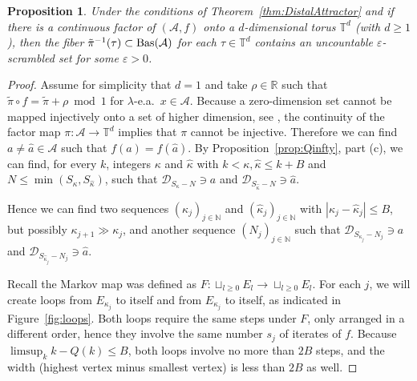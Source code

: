 \documentclass[12pt, psamsfonts, reqno]{amsart}
\newtheorem{proposition}[theorem]{Proposition}
\begin{document}
\begin{proposition}\label{prop:scrambled_fibers}
Under the conditions of Theorem~\ref{thm:DistalAttractor}
and if there is a continuous factor of
$({{\mathcal A}}, f)$ onto a $d$-dimensional torus ${{\mathbb T}}^d$
(with $d \geq 1$),
then the fiber $\tilde \pi^{-1}(\tau) \subset {\mathop{\rm Bas}\nolimits}({{\mathcal A}})$ for each
$\tau \in {{\mathbb T}}^d$ contains an uncountable
${\varepsilon}$-scrambled set for some ${\varepsilon} > 0$.
\end{proposition}

\begin{proof}
Assume for simplicity that $d=1$ and take $\rho \in {{\mathbb R}}$ such that
$\tilde \pi \circ f = \tilde \pi + \rho \bmod 1$ for $\lambda$-e.a.\ $x \in {{\mathcal A}}$.
Because a zero-dimension set cannot be mapped injectively onto a set
of higher dimension, see \cite{Engel},
the continuity of the factor map $\pi:{{\mathcal A}} \to {{\mathbb T}}^d$ implies
that $\pi$ cannot be injective.
Therefore we can find $a \neq \hat a \in {{\mathcal A}}$
such that $f(a) = f(\hat a)$.
By Proposition~\ref{prop:Qinfty}, part (c),
we can find, for every $k$,
integers $\kappa$ and $\hat \kappa$ with $k < \kappa, \hat \kappa \leq k+B$
and $N \leq \min(S_\kappa, S_{\hat \kappa})$,
such that ${{\mathcal D}}_{S_{\kappa} - N} \owns a$ and
${{\mathcal D}}_{S_{\hat \kappa} - N} \owns \hat a$.

Hence we can find two sequences $(\kappa_j)_{j \in {{\mathbb N}}}$ and
$(\hat \kappa_j)_{j \in {{\mathbb N}}}$ with $|\kappa_j - \hat \kappa_j| \le B$, but
possibly $\kappa_{j+1} \gg \kappa_j$, and another sequence $(N_j)_{j \in {{\mathbb N}}}$
such that ${{\mathcal D}}_{S_{\kappa_j} - N_j} \owns a$
and ${{\mathcal D}}_{S_{\hat\kappa_j} - N_j} \owns \hat a$.

Recall the Markov map was defined as
$F: \sqcup_{l \geq 0} E_l \to \sqcup_{l \geq 0} E_l$.
For each $j$, we will create loops from $E_{\kappa_j}$ to itself
and  from $E_{\hat \kappa_j}$ to itself, as indicated in
Figure~\ref{fig:loops}. Both loops require the same steps under $F$,
only arranged in a different order, hence they involve the same number
$s_j$ of iterates of $f$.
Because $\limsup_k k - Q(k) \leq B$, both loops involve no more than $2B$ steps,
and the width (highest vertex minus smallest vertex) is less than $2B$ as well.


\end{proof}
\end{document}
